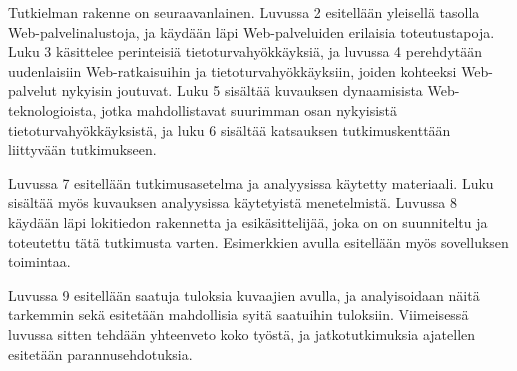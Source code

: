 Tutkielman rakenne on seuraavanlainen. Luvussa 2 esitellään yleisellä
tasolla Web-palvelinalustoja, ja käydään läpi Web-palveluiden
erilaisia toteutustapoja. Luku 3 käsittelee perinteisiä
tietoturvahyökkäyksiä, ja luvussa 4 perehdytään uudenlaisiin
Web-ratkaisuihin ja tietoturvahyökkäyksiin, joiden kohteeksi
Web-palvelut nykyisin joutuvat.  Luku 5 sisältää kuvauksen
dynaamisista Web-teknologioista, jotka mahdollistavat suurimman osan
nykyisistä tietoturvahyökkäyksistä, ja luku 6 sisältää katsauksen
tutkimuskenttään liittyvään tutkimukseen.

Luvussa 7 esitellään tutkimusasetelma ja analyysissa käytetty
materiaali. Luku sisältää myös kuvauksen analyysissa käytetyistä
menetelmistä. Luvussa 8 käydään läpi lokitiedon rakennetta ja
esikäsittelijää, joka on on suunniteltu ja toteutettu tätä tutkimusta
varten. Esimerkkien avulla esitellään myös sovelluksen toimintaa.

Luvussa 9 esitellään saatuja tuloksia kuvaajien avulla, ja
analyisoidaan näitä tarkemmin sekä esitetään mahdollisia syitä
saatuihin tuloksiin. Viimeisessä luvussa sitten tehdään yhteenveto
koko työstä, ja jatkotutkimuksia ajatellen esitetään
parannusehdotuksia.
